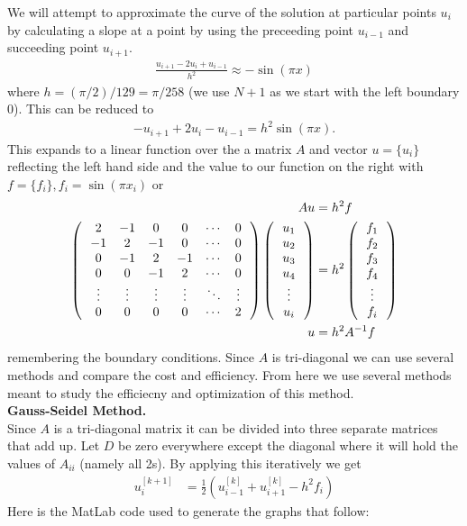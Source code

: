 \documentclass[12pt,a4paper]{report}
\begin{document}
We will attempt to approximate the curve of  the solution at particular points $u_i$ by calculating a slope at a point by using the preceeding point $u_{i-1}$ and succeeding point $u_{i+1}$.  
\begin{align*}
	\frac{u_{i+1}-2u_i+u_{i-1}}{h^2} \approx -\sin (\pi x)
\end{align*}where $h=(\pi/2)/129=\pi/258$ (we use $N+1$ as we start with the left boundary 0).  This can be reduced to 
\begin{align*}
	-u_{i+1}+2u_i-u_{i-1} = h^2\sin (\pi x).
\end{align*}This expands to a linear function over the a matrix $A$ and vector $u=\{ u_i \}$ reflecting the left hand side and the value to our function on the right with $f=\{ f_i \}, f_i=\sin(\pi x_i)$ or
\begin{align*}
	Au &= h^2 f\\
	\left (\, \begin{array}{cccccc}
		2 & -1 & 0 & 0 &\cdots & 0\\
		-1 & 2 & -1 & 0 &\cdots & 0\\
		0 & -1 & 2 & -1 &\cdots & 0\\
		0 & 0 &-1 & 2 & \cdots & 0\\
		\vdots & \vdots & \vdots & \vdots &\ddots & \vdots\\
		0 & 0 & 0 & 0 & \cdots & 2
	\end{array}  \,\right ) \left (\, \begin{array}{c}  u_1 \\ u_2 \\ u_3 \\ u_4 \\ \vdots \\ u_i  \end{array}  \,\right ) &= h^2 \left (\, \begin{array}{c}  f_1 \\ f_2 \\ f_3 \\ f_4 \\ \vdots \\ f_i  \end{array}  \,\right ) \\
	u &= h^2 A^{-1} f
\end{align*}remembering the boundary conditions.  Since $A$ is tri-diagonal we can use several methods and compare the cost and efficiency.  From here we use several methods meant to study the efficiecny and optimization of this method.\\

\noindent\textbf{Gauss-Seidel Method.}\\

Since $A$ is a tri-diagonal matrix it can be divided into three separate matrices that add up.  Let $D$ be zero everywhere except the diagonal where it will hold the values of $A_{ii}$ (namely all 2s).  By applying this iteratively we get
\begin{align*}
	u_i^{[k+1]} &= \frac{1}{2}(u_{i-1}^{[k]}+u_{i+1}^{[k]} - h^2 f_i)
\end{align*}Here is the MatLab code used to generate the graphs that follow:
	
	
\end{document}
